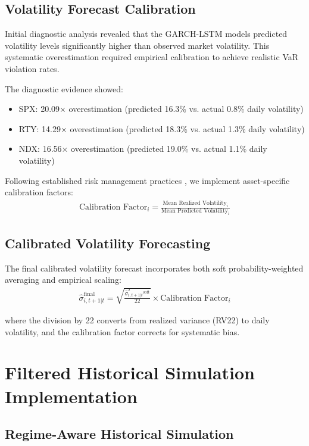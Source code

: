 \subsection{Volatility Forecast Calibration}

Initial diagnostic analysis revealed that the GARCH-LSTM models predicted volatility levels significantly higher than observed market volatility. This systematic overestimation required empirical calibration to achieve realistic VaR violation rates.

The diagnostic evidence showed:
\begin{itemize}
    \item SPX: 20.09× overestimation (predicted 16.3\% vs. actual 0.8\% daily volatility)
    \item RTY: 14.29× overestimation (predicted 18.3\% vs. actual 1.3\% daily volatility)  
    \item NDX: 16.56× overestimation (predicted 19.0\% vs. actual 1.1\% daily volatility)
\end{itemize}

Following established risk management practices \citep{Campbell2008}, we implement asset-specific calibration factors:
\begin{align}
\text{Calibration Factor}_i = \frac{\text{Mean Realized Volatility}_i}{\text{Mean Predicted Volatility}_i}
\end{align}

\subsection{Calibrated Volatility Forecasting}

The final calibrated volatility forecast incorporates both soft probability-weighted averaging and empirical scaling:
\begin{align}
\hat{\sigma}_{i,t+1|t}^{\text{final}} = \sqrt{\frac{\hat{\sigma}^2_{i,t+1|t}^{\text{soft}}}{22}} \times \text{Calibration Factor}_i
\end{align}

where the division by 22 converts from realized variance (RV22) to daily volatility, and the calibration factor corrects for systematic bias.

\section{Filtered Historical Simulation Implementation}

\subsection{Regime-Aware Historical Simulation}

